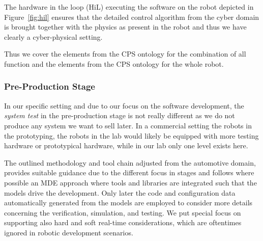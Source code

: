 %
The hardware in the loop (HiL) executing the software on the robot depicted in Figure~\ref{fig:hil} ensures that the detailed control algorithm from the cyber domain is brought together with the physics as present in the robot and thus we have clearly a cyber-physical setting. 

Thus we cover the elements \CPSCyberPart from the CPS ontology for the combination of all function and the elements \CPSPhysicalPart from the CPS ontology for the whole robot.




\subsubsection{Pre-Production Stage}
%
In our specific setting and due to our focus on the software development, the \emph{system test} in the pre-production stage is not really different as we do not produce any system we want to sell later. In a commercial setting the robots in the prototyping, the robots in the lab would likely be equipped with more testing hardware or prototypical hardware, while in our lab only one level exists here.

The outlined methodology and tool chain adjusted from the automotive domain, provides suitable guidance due to the different focus in stages and follows where possible an MDE approach where tools and libraries are integrated such that the models drive the development. Only later the code and configuration data automatically generated from the models are employed to consider more details concerning the verification, simulation, and testing.
%
We put special focus on supporting also hard and soft real-time considerations, which are oftentimes ignored in robotic development scenarios.





